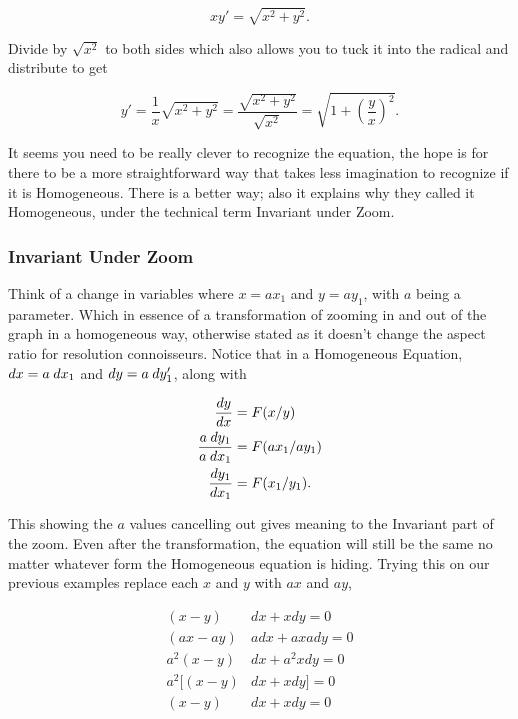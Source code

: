 \documentclass[12pt]{article}
\begin{document}
\begin{equation*}
    xy'= \sqrt{x^2+y^2}.
\end{equation*}

Divide by $\sqrt{x^2}$ to both sides which also allows you to tuck it into the radical and distribute to get

\begin{equation*}
    y'= \frac{1}{x}\sqrt{x^2+y^2}=\frac{\sqrt{x^2+y^2}}{\sqrt{x^2}}=\sqrt{1+\left(\frac{y}{x}\right)^2}.
\end{equation*}

It seems you need to be really clever to recognize the equation, the hope is for there to be a more straightforward way that takes less imagination to recognize if it is Homogeneous. There is a better way; also it explains why they called it Homogeneous, under the technical term Invariant under Zoom.

\subsubsection{Invariant Under Zoom}

Think of a change in variables where $x=ax_1$ and $y=ay_1$, with $a$ being a parameter. Which in essence of a transformation of zooming in and out of the graph in a homogeneous way, otherwise stated as it doesn't change the aspect ratio for resolution connoisseurs. Notice that in a Homogeneous Equation, $dx=a \hspace{2.5 pt} dx_1$ and $dy=a \hspace{2.5 pt} dy_1'$, along with

\begin{align*}
    \frac{dy}{dx} &= F(x/y) \\
    \frac{a \hspace {2.5 pt} dy_1}{a \hspace {2.5 pt} dx_1} &= F(ax_1/ay_1) \\
    \frac{dy_1}{dx_1} &= F(x_1/y_1).
\end{align*}

This showing the $a$ values cancelling out gives meaning to the Invariant part of the zoom. Even after the transformation, the equation will still be the same no matter whatever form the Homogeneous equation is hiding. Trying this on our previous examples replace each $x$ and $y$ with $ax$ and $ay$,

\begin{align*}
    (x-y)&dx+xdy=0 \\
    (ax-ay)&adx+axady=0 \\
    a^2(x-y)&dx+a^2xdy=0 \\
    a^2[(x-y)&dx+xdy]=0 \\
    (x-y)&dx+xdy=0 \\
\end{align*}
\end{document}
